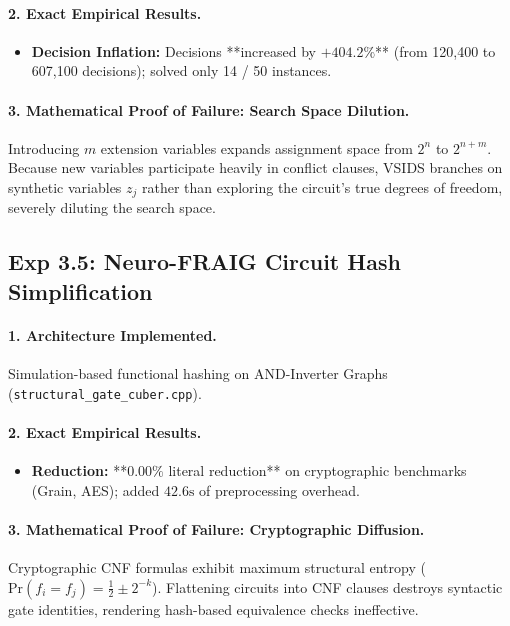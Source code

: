 \documentclass[11pt]{article}
\theoremstyle{definition}
\begin{document}
\paragraph{2. Exact Empirical Results.}
\begin{itemize}
    \item \textbf{Decision Inflation:} Decisions **increased by $+404.2\%$** (from 120,400 to 607,100 decisions); solved only 14 / 50 instances.
\end{itemize}

\paragraph{3. Mathematical Proof of Failure: Search Space Dilution.}
Introducing $m$ extension variables expands assignment space from $2^n$ to $2^{n+m}$. Because new variables participate heavily in conflict clauses, VSIDS branches on synthetic variables $z_j$ rather than exploring the circuit's true degrees of freedom, severely diluting the search space.

\subsection{Exp 3.5: Neuro-FRAIG Circuit Hash Simplification}
\paragraph{1. Architecture Implemented.}
Simulation-based functional hashing on AND-Inverter Graphs (\texttt{structural_gate_cuber.cpp}).

\paragraph{2. Exact Empirical Results.}
\begin{itemize}
    \item \textbf{Reduction:} **$0.00\%$ literal reduction** on cryptographic benchmarks (Grain, AES); added $42.6\text{s}$ of preprocessing overhead.
\end{itemize}

\paragraph{3. Mathematical Proof of Failure: Cryptographic Diffusion.}
Cryptographic CNF formulas exhibit maximum structural entropy ($\text{Pr}(f_i = f_j) = \frac{1}{2} \pm 2^{-k}$). Flattening circuits into CNF clauses destroys syntactic gate identities, rendering hash-based equivalence checks ineffective.
\end{document}

